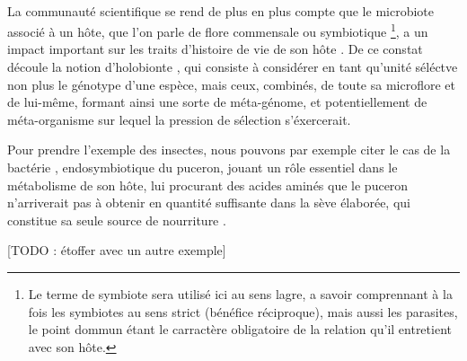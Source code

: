 
\paragraph{} %
\label{par:intro1}

La communauté scientifique se rend de plus en plus compte que le microbiote
associé à un hôte, que l'on parle de flore commensale ou symbiotique
\footnote{Le terme de symbiote sera utilisé ici au sens lagre, a savoir
comprennant à la fois les symbiotes au sens strict (bénéfice réciproque), mais
aussi les parasites, le point dommun étant le carractère obligatoire de la
relation qu'il entretient avec son hôte.}, a un impact important sur les
traits d'histoire de vie de son hôte \cite{feldhaar2011}. De ce constat
découle la notion d'holobionte \cite{rosenberg2007}, qui consiste à considérer
en tant qu'unité séléctve non plus le génotype d'une espèce, mais ceux,
combinés, de toute sa microflore et de lui-même, formant ainsi une sorte de
méta-génome, et potentiellement de méta-organisme sur lequel la pression de
sélection s'éxercerait.

Pour prendre l'exemple des insectes, nous pouvons par exemple citer le cas de
la bactérie ,  endosymbiotique du puceron, jouant un rôle
essentiel dans le métabolisme de son hôte, lui procurant des acides aminés que
le puceron n'arriverait pas à obtenir en quantité suffisante dans la sève
élaborée, qui constitue sa seule source de nourriture \cite{douglas1998}.

[TODO : étoffer avec un autre exemple]



